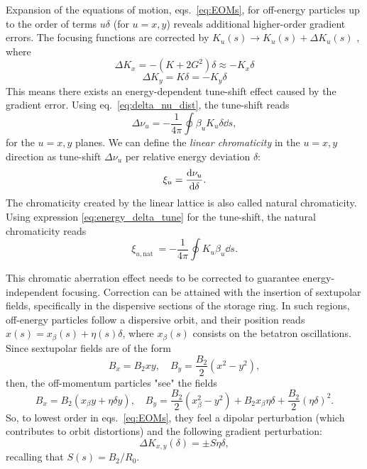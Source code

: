 Expansion of the equations of motion, eqs.~\eqref{eq:EOMs}, for off-energy particles up to the order of terms $u\delta$ (for $u=x,y$) reveals additional higher-order gradient errors. The focusing functions are corrected by $K_u(s)\to K_u(s) + \Delta K_u(s)$ \cite{lee_accelerator_2004,huang_beam-based_2019}, where
\begin{equation}
    \Delta K_x = -(K+2G^2)\delta \approx - K_x\delta
\end{equation}
\begin{equation}
    \Delta K_y = K\delta = - K_y\delta
\end{equation}
This means there exists an energy-dependent tune-shift effect caused by the gradient error. Using eq.~\eqref{eq:delta_nu_dist}, the tune-shift reads
\begin{equation}
    \Delta \nu_u = - \frac{1}{4\pi}\oint\beta_u K_u \delta \dd{s},
    \label{eq:energy_delta_tune}
\end{equation}
for the $u=x,y$ planes. We can define the \textit{linear chromaticity} in the $u=x,y$ direction as tune-shift $\Delta \nu_u$ per relative energy deviation $\delta$:
\begin{equation}
    \xi_u=\dv{\nu_u}{\delta}.
\end{equation}
 The chromaticity created by the linear lattice is also called natural chromaticity. Using expression \eqref{eq:energy_delta_tune} for the tune-shift, the natural chromaticity reads
\begin{equation}
\xi_{u, \text {nat }} =-\frac{1}{4 \pi} \oint K_u \beta_u \dd{s}.
\end{equation}

This chromatic aberration effect needs to be corrected to guarantee energy-independent focusing. Correction can be attained with the insertion of sextupolar fields, specifically in the dispersive sections of the storage ring. In such regions, off-energy particles follow a dispersive orbit, and their position reads $x(s)=x_{\beta}(s)+\eta(s) \delta$, where $x_{\beta}(s)$ consists on the betatron oscillations. Since sextupolar fields are of the form
$$B_{x}=B_{2} x y, \quad B_{y}= \frac{B_{2}}{2}(x^{2}-y^{2}),$$
then, the off-momentum particles "see" the fields
$$B_{x}=B_{2}(x_\beta y + \eta \delta y), \quad B_{y}=\frac{B_{2}}{2}({x_\beta^{2}-y^{2}})+B_2 x_\beta \eta \delta + \frac{B_2}{2}(\eta \delta)^2.$$
So, to lowest order in eqs.~\eqref{eq:EOMs}, they feel a dipolar perturbation (which contributes to orbit distortions) and the following gradient perturbation:
$$\Delta K_{x,y}(\delta)=\pm S\eta \delta,$$
recalling that $S(s) = B_2 / R_0$.

